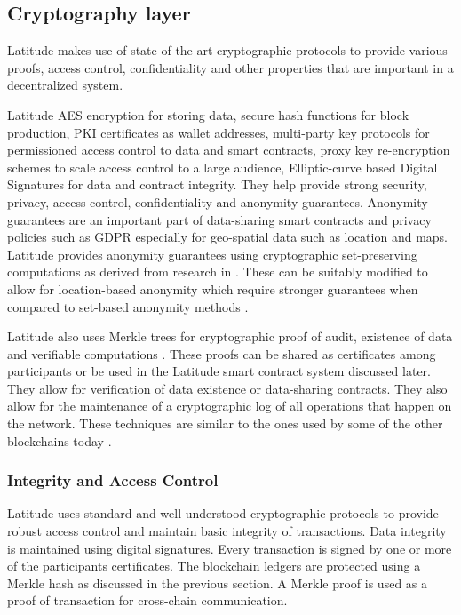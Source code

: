 \subsection{Cryptography layer} \label{sec:crypto} Latitude makes use of state-of-the-art cryptographic protocols to
provide various proofs, access control, confidentiality and other properties that are important in a decentralized
system.

Latitude AES encryption for storing data, secure hash functions for block production, PKI certificates as wallet
addresses, multi-party key protocols for permissioned access control to data and smart contracts, proxy key
re-encryption schemes to scale access control to a large audience, Elliptic-curve based Digital Signatures \cite{ecdsa}
for data and contract integrity. They help provide strong security, privacy, access control, confidentiality and
anonymity guarantees. Anonymity guarantees are an important part of data-sharing smart contracts and privacy policies
such as GDPR \cite{gdpr} especially for geo-spatial data such as location and maps.  Latitude provides anonymity
guarantees using cryptographic set-preserving computations as derived from research in \cite{kissner_set}. These can be
suitably modified to allow for location-based anonymity which require stronger guarantees when compared to set-based
anonymity methods \cite{divanis_kanon,xu_loc_anon}.

Latitude also uses Merkle trees for cryptographic proof of audit, existence of data and verifiable computations
\cite{becker2008}. These proofs can be shared as certificates among participants or be used in the Latitude smart
contract system discussed later. They allow for verification of data existence or data-sharing contracts. They also
allow for the maintenance of a cryptographic log of all operations that happen on the network. These techniques are
similar to the ones used by some of the other blockchains today \cite{buterin_merkle}.

\subsubsection{Integrity and Access Control}

Latitude uses standard and well understood cryptographic protocols to provide robust access control and maintain basic
integrity of transactions. Data integrity is maintained using digital signatures. Every transaction is signed by one or more of the participants
certificates. The blockchain ledgers are protected using a Merkle hash \cite{becker2008} as discussed in the previous
section. A Merkle proof is used as a proof of transaction for cross-chain communication.


